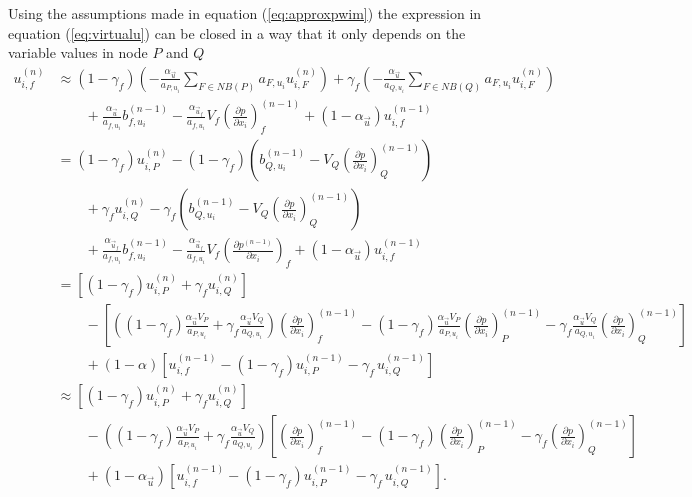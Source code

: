   Using the assumptions made in equation (\ref{eq:approxpwim}) the expression in equation (\ref{eq:virtualu}) can be closed in a way that it only depends on the variable values in node \(P\) and \(Q\)
  \begin{align}
    \label{eq:closepwim}
    u_{i,f}^{(n)} 
    &\approx 
    \left(1-\gamma_f\right)  \left( -\frac{\alpha_\vec{u}}{a_{P,u_i}} \sum_{F \in NB(P)} a_{F,u_i} u_{i,F}^{(n)} \right)
    +\gamma_f  \left( -\frac{\alpha_\vec{u}}{a_{Q,u_i}} \sum_{F \in NB(Q)} a_{F,u_i} u_{i,F}^{(n)}  \right) \nonumber \\[1em]
    &\quad\quad+ \frac{\alpha_\vec{u}}{a_{f,u_i}}b_{f,u_i}^{(n-1)} 
    - \frac{\alpha_{\vec{u}_f}}{a_{f,u_i}}V_f\left(\frac{\partial p}{\partial x_i}\right)_f^{(n-1)} 
    + \left(1 - \alpha_{\vec{u}}\right) u_{i,f}^{(n-1)} \nonumber \\[1em]
    &=
    \left(1-\gamma_f\right) u_{i,P}^{(n)} - \left(1 - \gamma_f\right) \left(  b_{Q,u_i}^{(n-1)} - V_Q \left(\frac{\partial p}{\partial x_i}\right)_Q^{(n-1)} \right) \nonumber \\[1em]
    &\quad\quad+\gamma_f  u_{i,Q}^{(n)} - \gamma_f\left( b_{Q,u_i}^{(n-1)} - V_Q \left(\frac{\partial p}{\partial x_i}\right)_Q^{(n-1)}  \right) \nonumber \\[1em]
    &\quad\quad+ \frac{\alpha_{\vec{u}_f}}{a_{f,u_i}}b_{f,u_i}^{(n-1)} 
    - \frac{\alpha_{\vec{u}_f}}{a_{f,u_i}}V_f\left(\frac{\partial p^{(n-1)}}{\partial x_i}\right)_f 
    + \left(1 - \alpha_{\vec{u}}\right) u_{i,f}^{(n-1)} \nonumber\\[1em]
    &=
    \left[\left(1 - \gamma_f\right) u_{i,P}^{(n)} + \gamma_f u_{i,Q}^{(n)} \right] \nonumber\\[1em]
    &\quad\quad - 
    \left[ 
    \left(\left(1 - \gamma_f\right) \frac{\alpha_\vec{u} V_P}{a_{P,u_i}} + \gamma_f \frac{\alpha_\vec{u} V_Q}{a_{Q,u_i}}\right)
    \left(\frac{\partial p}{\partial x_i}\right)_f^{(n-1)} 
    - \left(1 - \gamma_f \right) \frac{\alpha_\vec{u} V_P}{a_{P,u_i}}\left( \frac{\partial p}{\partial x_i} \right)_P^{(n-1)} 
    - \gamma_f \frac{\alpha_\vec{u} V_Q}{a_{Q,u_i}}\left(\frac{\partial p}{\partial x_i}\right)_Q^{(n-1)}
    \right] \nonumber \\[1em]
    &\quad\quad + \left(1 - \alpha\right) \left[ u_{i,f}^{(n-1)} - \left(1 - \gamma_f\right) u_{i,P}^{(n-1)} - \gamma_f \, u_{i,Q}^{(n-1)} \right] \nonumber \\[1em]
    &\approx
    \left[\left(1 - \gamma_f\right) u_{i,P}^{(n)} + \gamma_f u_{i,Q}^{(n)} \right] \nonumber\\[1em]
    &\quad\quad - 
    \left(\left(1 - \gamma_f\right) \frac{\alpha_\vec{u} V_P}{a_{P,u_i}} + \gamma_f \frac{\alpha_\vec{u} V_Q}{a_{Q,u_i}}\right)
    \left[ 
    \left(\frac{\partial p}{\partial x_i}\right)_f^{(n-1)} 
    - \left(1 - \gamma_f \right) \left( \frac{\partial p}{\partial x_i} \right)_P^{(n-1)} 
    - \gamma_f \left(\frac{\partial p}{\partial x_i}\right)_Q^{(n-1)}
    \right] \nonumber \\[1em]
    &\quad\quad + \left(1 - \alpha_\vec{u}\right) \left[ u_{i,f}^{(n-1)} - \left(1 - \gamma_f\right) u_{i,P}^{(n-1)} - \gamma_f \, u_{i,Q}^{(n-1)} \right].
  \end{align}
